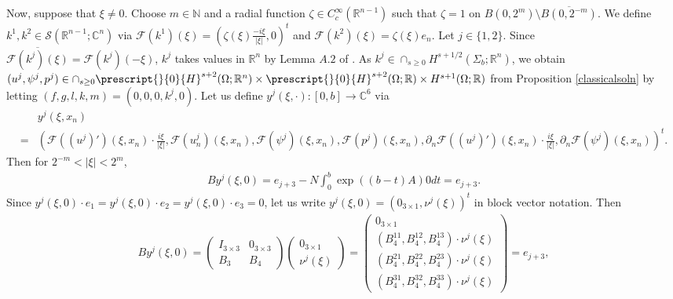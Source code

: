 \documentclass[11pt,letterpaper,reqno]{amsart}
\numberwithin{equation}{section}
\newcommand{\abs}[1]{\left\lvert#1\right\rvert}
\begin{document}
Now, suppose that \(\xi \neq 0\). Choose \(m \in \mathbb{N}\) and a radial function \(\zeta \in C_{c}^{\infty}(\mathbb{R}^{n-1})\) such that \(\zeta=1\) on \(B(0,2^{m}) \setminus \overline{B(0,2^{-m})}\). We define \(k^{1}, k^{2} \in \mathscr{S}(\mathbb{R}^{n-1};\mathbb{C}^{n})\) via \(\mathcal{F}(k^{1})(\xi)=(\zeta(\xi)\frac{-i\xi}{\abs{\xi}},0)^{t}\) and \(\mathcal{F}(k^{2})(\xi)=\zeta(\xi)e_{n}\). Let \(j \in \{1,2\}\). Since \(\overline{\mathcal{F}(k^{j})(\xi)}=\mathcal{F}(k^{j})(-\xi)\), \(k^{j}\) takes values in \(\mathbb{R}^{n}\) by Lemma \(A.2\) of \cite{leoni2023traveling}. As \(k^{j}\in \cap_{s \geq 0}H^{s+1/2}(\Sigma_{b};\mathbb{R}^{n})\), we obtain \((u^{j}, \psi^{j}, p^{j}) \in \cap_{s \geq 0}\prescript{}{0}{H}^{s+2}(\Omega;\mathbb{R}^{n}) \times \prescript{}{0}{H}^{s+2}(\Omega;\mathbb{R}) \times H^{s+1}(\Omega;\mathbb{R})\) from Proposition \ref{classicalsoln} by letting \((f,g,l,k,m)=(0,0,0,k^{j},0)\). Let us define \(y^{j}(\xi,\cdot):[0,b] \to \mathbb{C}^{6}\) via
\begin{align}
    &y^{j}(\xi,x_{n}) \nonumber\\
    =&\left(\mathcal{F}((u^{j})')(\xi,x_{n})\cdot\frac{i\xi}{\abs{\xi}},\mathcal{F}(u_{n}^{j})(\xi,x_{n}), \mathcal{F}(\psi^{j})(\xi,x_{n}),\mathcal{F}(p^{j})(\xi,x_{n}),\partial_{n}\mathcal{F}((u^{j})')(\xi,x_{n}) \cdot \frac{i\xi}{\abs{\xi}},\partial_{n}\mathcal{F}(\psi^{j})(\xi,x_{n})\right)^{t}.
\end{align}
Then for \(2^{-m}<\abs{\xi}<2^{m}\),
\begin{align}
    By^{j}(\xi,0)=
    e_{j+3}    
    -N\int_{0}^{b}\exp((b-t)A) 0    dt=e_{j+3}.
\end{align}
Since \(y^{j}(\xi,0) \cdot e_{1}=y^{j}(\xi,0) \cdot e_{2} =y^{j}(\xi,0) \cdot e_{3}=0\), let us write \(y^{j}(\xi,0)=(0_{3 \times 1},\nu^{j}(\xi))^{t}\) in block vector notation. Then
\begin{align}
    By^{j}(\xi,0)=
    \begin{pmatrix}
        I_{3 \times 3} & 0_{3 \times 3} \\
        B_{3} & B_{4}
    \end{pmatrix}
    \begin{pmatrix}
        0_{3 \times 1} \\
        \nu^{j}(\xi)
    \end{pmatrix}
    =
    \begin{pmatrix}
        0_{3 \times 1} \\
        (B_{4}^{11}, B_{4}^{12}, B_{4}^{13}) \cdot \nu^{j}(\xi) \\
        (B_{4}^{21}, B_{4}^{22}, B_{4}^{23}) \cdot \nu^{j}(\xi) \\
        (B_{4}^{31}, B_{4}^{32}, B_{4}^{33}) \cdot \nu^{j}(\xi)
    \end{pmatrix}
    =e_{j+3},
\end{align}
\end{document}

